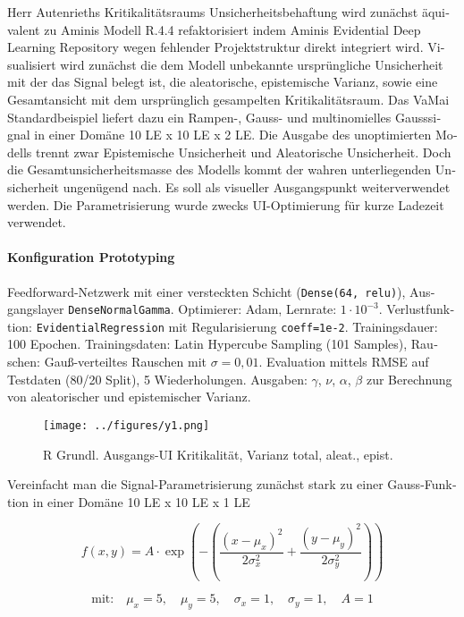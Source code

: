 \begin{otherlanguage}{ngerman}
Herr Autenrieths Kritikalitätsraums Unsicherheitsbehaftung wird zunächst äquivalent zu Aminis Modell R.4.4 refaktorisiert indem Aminis Evidential Deep Learning Repository wegen fehlender Projektstruktur direkt integriert wird. Visualisiert wird zunächst die dem Modell unbekannte ursprüngliche Unsicherheit mit der das Signal belegt ist, die aleatorische, epistemische Varianz, sowie eine Gesamtansicht mit dem ursprünglich gesampelten Kritikalitätsraum. Das VaMai Standardbeispiel liefert dazu ein Rampen-, Gauss- und multinomielles Gausssignal in einer Domäne 10 LE x 10 LE x 2 LE. Die Ausgabe des unoptimierten Modells trennt zwar \gls{Epistemische Unsicherheit} und \gls{Aleatorische Unsicherheit}. Doch die Gesamtunsicherheitsmasse des Modells kommt der wahren unterliegenden Unsicherheit ungenügend nach. Es soll als visueller Ausgangspunkt weiterverwendet werden. Die Parametrisierung wurde zwecks UI-Optimierung für kurze Ladezeit verwendet.



\paragraph{Konfiguration \glqq Prototyping \grqq} Feedforward-Netzwerk mit einer versteckten Schicht (\texttt{Dense(64, relu)}), Ausgangslayer \texttt{DenseNormalGamma}. Optimierer: Adam, Lernrate: $1\cdot10^{-3}$. Verlustfunktion: \texttt{EvidentialRegression} mit Regularisierung \texttt{coeff=1e-2}. Trainingsdauer: 100 Epochen. Trainingsdaten: Latin Hypercube Sampling (101 Samples), Rauschen: Gauß-verteiltes Rauschen mit $\sigma = 0{,}01$. Evaluation mittels RMSE auf Testdaten (80/20 Split), 5 Wiederholungen. Ausgaben: $\gamma$, $\nu$, $\alpha$, $\beta$ zur Berechnung von aleatorischer und epistemischer Varianz.

\begin{figure}[!ht]
  \centering
  \texttt{[image: ../figures/y1.png]}
  \caption{R Grundl. Ausgangs-UI Kritikalität, Varianz total, aleat., epist.}
\end{figure}

Vereinfacht man die Signal-Parametrisierung zunächst stark zu einer Gauss-Funktion in einer Domäne 10 LE x 10 LE x 1 LE

\[
f(x, y) = A \cdot \exp\left( -\left( \frac{(x - \mu_x)^2}{2\sigma_x^2} + \frac{(y - \mu_y)^2}{2\sigma_y^2} \right) \right)
\]

\[
\text{mit:} \quad \mu_x = 5,\quad \mu_y = 5,\quad \sigma_x = 1,\quad \sigma_y = 1,\quad A = 1
\]


\end{otherlanguage}
